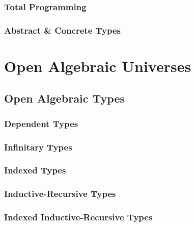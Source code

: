 \documentclass[12pt]{report}
\theoremstyle{definition}
\theoremstyle{remark}
\numberwithin{definition}{section}
\numberwithin{equation}{section}
\numberwithin{proposition}{section}
\numberwithin{conjecture}{section}
\numberwithin{theorem}{section}
\numberwithin{lemma}{section}
\numberwithin{corollary}{section}
\numberwithin{example}{section}
\numberwithin{remark}{section}
\begin{document}
\section{Total Programming}


\section{Abstract \& Concrete Types}

\part{Open Algebraic Universes}\label{part:open}

\chapter{Open Algebraic Types}\label{ch:open}
\section{Dependent Types}
\section{Infinitary Types}
\section{Indexed Types}
\section{Inductive-Recursive Types}
\section{Indexed Inductive-Recursive Types}


\end{document}
